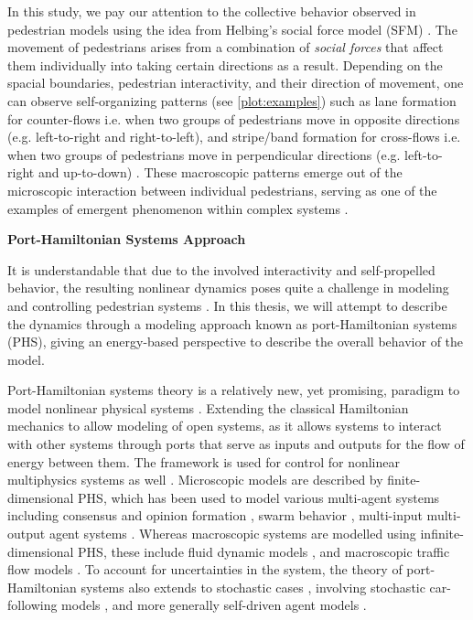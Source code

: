 In this study, we pay our attention to the collective behavior observed in pedestrian models using the idea from Helbing's social force model (SFM) \cite{helbing1995social}. The movement of pedestrians arises from a combination of \textit{social forces} that affect them individually into taking certain directions as a result. Depending on the spacial boundaries, pedestrian interactivity, and their direction of movement, one can observe self-organizing patterns (see \autoref{plot:examples}) such as lane formation for counter-flows i.e. when two groups of pedestrians move in opposite directions (e.g. left-to-right and right-to-left), and stripe/band formation for cross-flows i.e. when two groups of pedestrians move in perpendicular directions (e.g. left-to-right and up-to-down) \cite{Mullick_2022,sieben2017collective,khelfa2021initiating,tordeux2022multi}. These macroscopic patterns emerge out of the microscopic interaction between individual pedestrians, serving as one of the examples of emergent phenomenon within complex systems \cite{fromm2004emergence}.

\textbf{Port-Hamiltonian Systems Approach}

It is understandable that due to the involved interactivity and self-propelled behavior, the resulting nonlinear dynamics poses quite a challenge in modeling and controlling pedestrian systems \cite{appertrolland2024modellingvehiclepedestriancollective}. In this thesis, we will attempt to describe the  dynamics through a modeling approach known as port-Hamiltonian systems (PHS), giving an energy-based perspective to describe the overall behavior of the model. 

Port-Hamiltonian systems theory is a relatively new, yet promising, paradigm to model nonlinear physical systems \cite{van2014port,duindam2009modeling}. Extending the classical Hamiltonian mechanics to allow modeling of open systems, as it allows systems to interact with other systems through ports that serve as inputs and outputs for the flow of energy between them. The framework is used for control for nonlinear multiphysics systems as well \cite{van2024port,van2004port}. Microscopic models are described by finite-dimensional PHS, which has been used to model various multi-agent systems including consensus and opinion formation \cite{van2013port,xue2019opinion}, swarm behavior \cite{matei2019inferring}, multi-input multi-output agent systems \cite{sharf2019analysis}. Whereas macroscopic systems are modelled using infinite-dimensional PHS, these include fluid dynamic models \cite{rashad2021port}, and macroscopic traffic flow models \cite{bansal2021port}. To account for uncertainties in the system, the theory of port-Hamiltonian systems also extends to stochastic cases \cite{cordoni2022stochastic}, involving stochastic car-following models \cite{rudiger2024stability}, and more generally self-driven agent models \cite{ehrhardt2024collective}.




